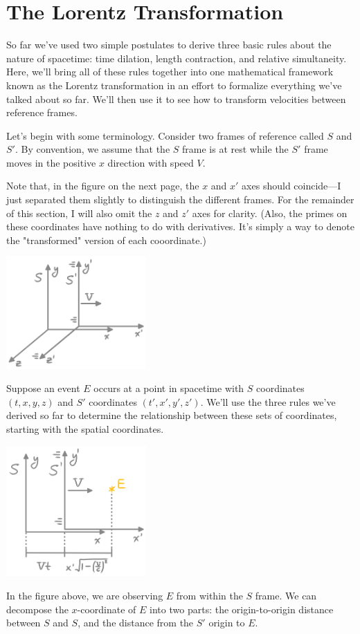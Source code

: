\documentclass[10pt,a4paper,oneside]{book}
\begin{document}
\section{The Lorentz Transformation}
So far we've used two simple postulates to derive three basic rules about the nature of spacetime: time dilation, length contraction, and relative simultaneity.
Here, we'll bring all of these rules together into one mathematical framework known as the Lorentz transformation in an effort to formalize everything we've talked about so far.
We'll then use it to see how to transform velocities between reference frames.

Let's begin with some terminology.
Consider two frames of reference called $S$ and $S'$.
By convention, we assume that the $S$ frame is at rest while the $S'$ frame moves in the positive $x$ direction with speed $V$.

Note that, in the figure on the next page, the $x$ and $x'$ axes should coincide---I just separated them slightly to distinguish the different frames.
For the remainder of this section, I will also omit the $z$ and $z'$ axes for clarity.
(Also, the primes on these coordinates have nothing to do with derivatives.
It's simply a way to denote the "transformed" version of each cooordinate.)
\begin{center}
    \includegraphics[width=0.4\textwidth]{movFrames.png}
\end{center}
Suppose an event $E$ occurs at a point in spacetime with $S$ coordinates $(t, x, y, z)$ and $S'$ coordinates $(t', x', y', z')$.
We'll use the three rules we've derived so far to determine the relationship between these sets of coordinates, starting with the spatial coordinates.
\begin{center}
    \includegraphics[width=0.4\textwidth]{movFramesSpat.png}
\end{center}
In the figure above, we are observing $E$ from within the $S$ frame.
We can decompose the $x$-coordinate of $E$ into two parts: the origin-to-origin distance between $S$ and $S$, and the distance from the $S'$ origin to $E$.
\end{document}
